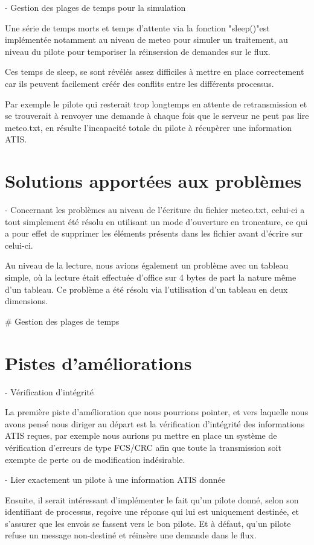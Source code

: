 \documentclass{report}
\begin{document}
{		- Gestion des plages de temps pour la simulation

		Une série de temps morts et temps d'attente via la fonction "sleep()"est implémentée notamment au niveau de meteo pour simuler un traitement, au niveau du pilote pour temporiser la réinsersion de demandes sur le flux.

		Ces temps de sleep, se sont révélés assez difficiles à mettre en place correctement car ils peuvent facilement créér des conflits entre les différents processus.

		Par exemple le pilote qui resterait trop longtemps en attente de retransmission et se trouverait à renvoyer une demande à chaque fois que le serveur ne peut pas lire meteo.txt, en résulte l'incapacité totale du pilote à récupèrer une information ATIS.

	\section{Solutions apportées aux problèmes}

		- Concernant les problèmes au niveau de l'écriture du fichier meteo.txt, celui-ci a tout simplement été résolu en utilisant un mode d'ouverture en troncature, ce qui a pour effet de supprimer les éléments présents dans les fichier avant d'écrire sur celui-ci.

		Au niveau de la lecture, nous avions également un problème avec un tableau simple, où la lecture était effectuée d'office sur 4 bytes de part la nature même d'un tableau. Ce problème a été résolu via l'utilisation d'un tableau en deux dimensions.

		\# Gestion des plages de temps

	\section{Pistes d'améliorations}

		- Vérification d'intégrité

		La première piste d'amélioration que nous pourrions pointer, et vers laquelle nous avons pensé nous diriger au départ est la vérification d'intégrité des informations ATIS reçues, par exemple nous aurions pu mettre en place un système de vérification d'erreurs de type FCS/CRC afin que toute la transmission soit exempte de perte ou de modification indésirable.
		
		- Lier exactement un pilote à une information ATIS donnée

		Ensuite, il serait intéressant d'implémenter le fait qu'un pilote donné, selon son identifiant de processus, reçoive une réponse qui lui est uniquement destinée, et s'assurer que les envois se fassent vers le bon pilote. Et à défaut, qu'un pilote refuse un message non-destiné et réinsère une demande dans le flux.

}
\end{document}
